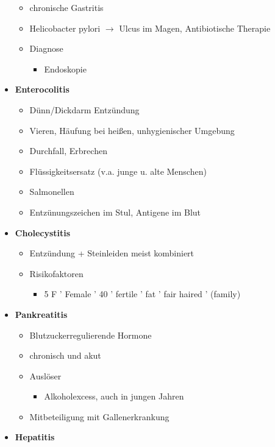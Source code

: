 \begin{itemize}
\begin{itemize}
\begin{itemize}
						\end{itemize}
					\item chronische Gastritis
					\item Helicobacter pylori $\rightarrow$ Ulcus im Magen, Antibiotische Therapie
					\item Diagnose
						\begin{itemize}
							\item Endoskopie
						\end{itemize}
				\end{itemize}
			\item \textbf{Enterocolitis}
				\begin{itemize}
					\item Dünn/Dickdarm Entzündung
					\item Vieren, Häufung bei heißen, unhygienischer Umgebung
					\item Durchfall, Erbrechen
					\item Flüssigkeitsersatz (v.a. junge u. alte Menschen)
					\item Salmonellen
					\item Entzünungszeichen im Stul, Antigene im Blut
				\end{itemize}
			\item \textbf{Cholecystitis}
				\begin{itemize}
					\item Entzündung + Steinleiden meist kombiniert
					\item Risikofaktoren
						\begin{itemize}
							\item 5 F
									' Female
									' 40
									' fertile
									' fat
									' fair haired
									' (family)
						\end{itemize}
				\end{itemize}
			\item \textbf{Pankreatitis}
				\begin{itemize}
					\item Blutzuckerregulierende Hormone
					\item chronisch und akut
					\item Auslöser
						\begin{itemize}
							\item Alkoholexcess, auch in jungen Jahren
						\end{itemize}
					\item Mitbeteiligung mit Gallenerkrankung
				\end{itemize}
			\item \textbf{Hepatitis}

\end{itemize}
